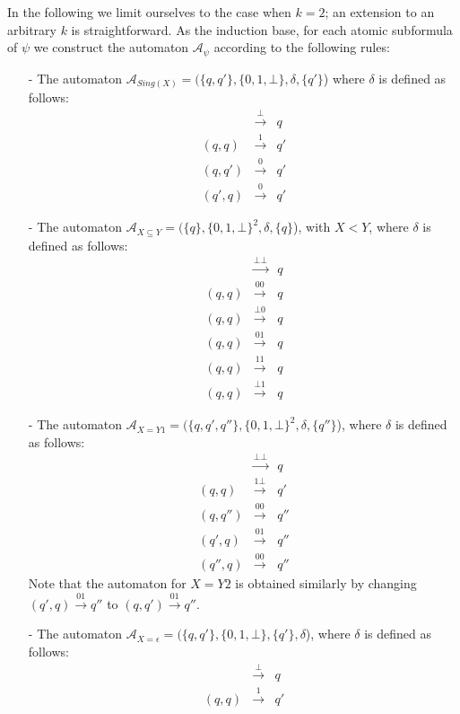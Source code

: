 In the following we limit ourselves to the case when $k = 2$; an extension to an
arbitrary $k$ is straightforward. As the induction base, for each atomic
subformula of $\psi$ we construct the automaton $\mathcal{A}_{\psi}$ according
to the following rules:
\begin{itemize}
 \item[-] The automaton $\mathcal{A}_{Sing(X)} = (\{q, q'\}, \{0, 1, \bot\},
 \delta, \{q'\}$) where $\delta$ is defined as follows:
\begin{eqnarray*}
  & \overset{\bot}{\longrightarrow} & q\\
 (q, q) & \overset{1}{\longrightarrow} & q'\\
 (q, q') & \overset{0}{\longrightarrow} & q'\\
 (q', q) & \overset{0}{\longrightarrow} & q'
\end{eqnarray*}
 \item[-] The automaton $\mathcal{A}_{X \subseteq Y} = (\{q\}, \{0, 1,
 \bot\}^2, \delta, \{q\}$), with $X < Y$, where $\delta$ is defined as follows:
\begin{eqnarray*}
  & \overset{\bot\bot}{\longrightarrow} & q\\
  (q, q) & \overset{00}{\longrightarrow} & q\\
  (q, q) & \overset{\bot 0}{\longrightarrow} & q\\
  (q, q) & \overset{01}{\longrightarrow} & q\\
  (q, q) & \overset{11}{\longrightarrow} & q\\
  (q, q) & \overset{\bot 1}{\longrightarrow} & q
\end{eqnarray*}
 \item[-] The automaton $\mathcal{A}_{X = Y1} = (\{q, q', q''\}, \{0, 1,
 \bot\}^2, \delta, \{q''\}$), where $\delta$ is defined as follows:
\begin{eqnarray*}
  & \overset{\bot\bot}{\longrightarrow} & q\\
  (q, q) & \overset{1\bot}{\longrightarrow} & q'\\
  (q, q'') & \overset{00}{\longrightarrow} & q''\\
  (q', q) & \overset{01}{\longrightarrow} & q''\\
  (q'', q) & \overset{00}{\longrightarrow} & q''
\end{eqnarray*}
Note that the automaton for $X = Y2$ is obtained similarly by changing $(q', q)
\overset{01}{\longrightarrow} q''$ to $(q, q') \overset{01}{\longrightarrow}
 q''$.
 \item[-] The automaton $\mathcal{A}_{X = \epsilon} = (\{q, q'\}, \{0, 1,
 \bot\}, \{q'\}, \delta$), where $\delta$ is defined as follows:
\begin{eqnarray*}
  & \overset{\bot}{\longrightarrow} & q\\
 (q, q) & \overset{1}{\longrightarrow}& q'
\end{eqnarray*}
\end{itemize}

